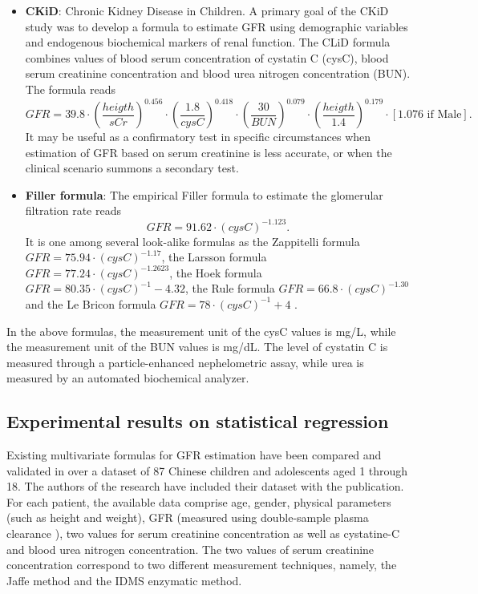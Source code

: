 \documentclass[10pt,final]{siamltex}
\begin{document}
\begin{itemize}
  \item \textbf{CKiD}: Chronic Kidney Disease in Children. A primary goal of the CKiD study was to develop a formula to estimate GFR using demographic variables and endogenous biochemical markers of renal function. The CLiD formula combines values of blood serum concentration of cystatin C (cysC), blood serum creatinine concentration and blood urea nitrogen concentration (BUN). The formula reads
  \begin{equation}
    \mathit{GFR} = 39.8 \cdot \left(\frac{heigth}{sCr}\right)^{0.456} \cdot \left(\frac{1.8}{cysC}\right)^{0.418} \cdot \left(\frac{30}{\textit{BUN}}\right)^{0.079} \cdot \left(\frac{heigth}{1.4}\right)^{0.179}\cdot [1.076 \text{ if Male}].
  \end{equation}
  It may be useful as a confirmatory test in specific circumstances when estimation of GFR based on serum creatinine is less accurate, or when the clinical scenario summons a secondary test\cite{grubb,schwartz3}.

  \item \textbf{Filler formula}: The empirical Filler formula to estimate the glomerular filtration rate reads
  \begin{equation}
    \textit{GFR} = 91.62 \cdot (cysC)^{-1.123}.
  \end{equation}
  It is one among several look-alike formulas as the Zappitelli formula $\textit{GFR} = 75.94 \cdot (cysC)^{-1.17}$, the Larsson formula $\textit{GFR} = 77.24 \cdot (cysC)^{-1.2623}$, the Hoek formula $\textit{GFR} = 80.35 \cdot (cysC)^{-1} - 4.32$, the Rule formula $\textit{GFR} = 66.8 \cdot (cysC)^{-1.30}$ and the Le Bricon formula $\textit{GFR} = 78 \cdot (cysC)^{-1} + 4$ \cite{laskin}.
\end{itemize}
%

In the above formulas, the measurement unit of the cysC values is mg/L, while the measurement unit of the BUN values is mg/dL. The level of cystatin C is measured through a particle-enhanced nephelometric assay, while urea is measured by an automated biochemical analyzer.
%
\subsection{Experimental results on statistical regression}
%
Existing multivariate formulas for GFR estimation have been compared and validated in \cite{gfr} over a dataset of 87 Chinese children and adolescents aged 1 through 18. The authors of the research have included their dataset with the publication. For each patient, the available data comprise age, gender, physical parameters (such as height and weight), GFR (measured using double-sample plasma clearance \cite{gold}), two values for serum creatinine concentration as well as cystatine-C and blood urea nitrogen concentration. The two values of serum creatinine concentration correspond to two different measurement techniques, namely, the Jaffe method and the IDMS enzymatic method.
\end{document}
